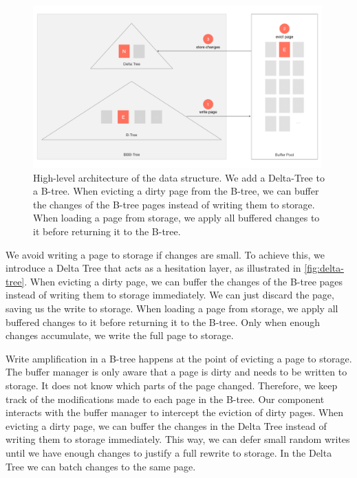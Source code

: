 \begin{figure}[htpb]
  \centering
  \includegraphics[width=0.99\textwidth]{figures/delta_tree.pdf}
  \caption{High-level architecture of the data structure. We add a Delta-Tree to a B-tree. When evicting a dirty page from the B-tree, we can buffer the changes of the B-tree pages instead of writing them to storage. When loading a page from storage, we apply all buffered changes to it before returning it to the B-tree.}
  \label{fig:delta-tree}
\end{figure}

We avoid writing a page to storage if changes are small.
To achieve this, we introduce a Delta Tree that acts as a hesitation layer, as illustrated in \autoref{fig:delta-tree}.
When evicting a dirty page, we can buffer the changes of the B-tree pages instead of writing them to storage immediately.
We can just discard the page, saving us the write to storage.
When loading a page from storage, we apply all buffered changes to it before returning it to the B-tree.
Only when enough changes accumulate, we write the full page to storage.

Write amplification in a B-tree happens at the point of evicting a page to storage.
The buffer manager is only aware that a page is dirty and needs to be written to storage.
It does not know which parts of the page changed.
Therefore, we keep track of the modifications made to each page in the B-tree.
Our component interacts with the buffer manager to intercept the eviction of dirty pages.
When evicting a dirty page, we can buffer the changes in the Delta Tree instead of writing them to storage immediately.
This way, we can defer small random writes until we have enough changes to justify a full rewrite to storage.
In the Delta Tree we can batch changes to the same page.

